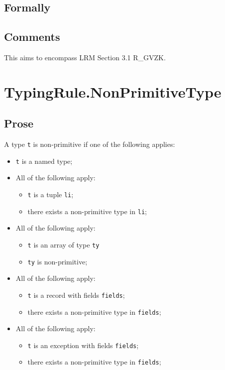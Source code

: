 \documentclass{book}
\begin{document}
    \subsection{Formally}

    \subsection{Comments}
    This aims to encompass LRM Section 3.1 R\_GVZK.

\section{TypingRule.NonPrimitiveType}

    \subsection{Prose} 
    A type \texttt{t} is non-primitive if one of the following applies:
    \begin{itemize}
    \item \texttt{t} is a named type;
    \item All of the following apply:
      \begin{itemize}
      \item \texttt{t} is a tuple \texttt{li};
      \item there exists a non-primitive type in \texttt{li};
      \end{itemize}
    \item All of the following apply:
      \begin{itemize}
      \item \texttt{t} is an array of type \texttt{ty}
      \item \texttt{ty} is non-primitive; 
      \end{itemize}
    \item All of the following apply:
      \begin{itemize}
      \item \texttt{t} is a record with fields \texttt{fields};
      \item there exists a non-primitive type in \texttt{fields};
      \end{itemize}
    \item All of the following apply:
      \begin{itemize}
      \item \texttt{t} is an exception with fields \texttt{fields};
      \item there exists a non-primitive type in \texttt{fields};
      \end{itemize}
    \end{itemize}
\end{document}
